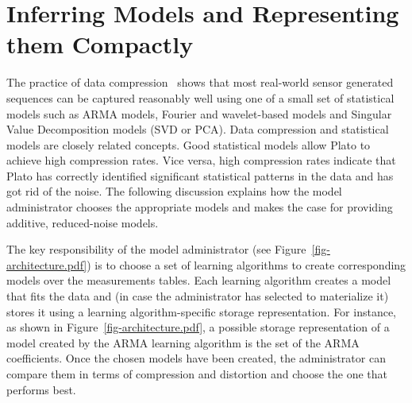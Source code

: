 
\section{Inferring Models and Representing them Compactly}
\label{sec:compression}
The practice of data compression~\cite{Sayood12} shows that most
real-world sensor generated sequences can be captured reasonably
well using one of a small set of statistical models such as ARMA
models, Fourier and wavelet-based models and Singular Value
Decomposition models (SVD or PCA). 
Data compression and statistical models are closely related
concepts. Good statistical models allow Plato to achieve high
compression rates. Vice versa, high compression rates indicate
that Plato has correctly identified significant statistical patterns
in the data and has got rid of the noise. The following discussion
explains how the model administrator chooses the appropriate models
and makes the case for providing additive, reduced-noise models.

The key responsibility of the model administrator (see Figure~\ref{fig-architecture.pdf}) is to choose a set of learning algorithms to create corresponding models over the measurements tables. Each learning algorithm creates a model that fits the data and (in case the administrator has selected to materialize it) stores it using a learning algorithm-specific storage representation. For instance, as shown in Figure~\ref{fig-architecture.pdf}, a possible storage representation of a model created by the ARMA learning algorithm is the set of the ARMA coefficients. Once the chosen models have been created, the administrator can compare them in terms of compression and distortion and choose the one that performs best.


